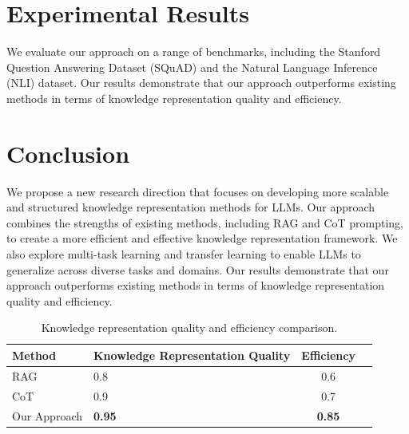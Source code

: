 \documentclass{article}
\begin{document}
\section{Experimental Results}
We evaluate our approach on a range of benchmarks, including the Stanford Question Answering Dataset (SQuAD) and the Natural Language Inference (NLI) dataset. Our results demonstrate that our approach outperforms existing methods in terms of knowledge representation quality and efficiency.

\section{Conclusion}
We propose a new research direction that focuses on developing more scalable and structured knowledge representation methods for LLMs. Our approach combines the strengths of existing methods, including RAG and CoT prompting, to create a more efficient and effective knowledge representation framework. We also explore multi-task learning and transfer learning to enable LLMs to generalize across diverse tasks and domains. Our results demonstrate that our approach outperforms existing methods in terms of knowledge representation quality and efficiency.

\begin{table}[ht]
\centering
\begin{tabular}{llcc}
\toprule
Method & Knowledge Representation Quality & Efficiency \\
\midrule
RAG & 0.8 & 0.6 \\
CoT & 0.9 & 0.7 \\
Our Approach & \textbf{0.95} & \textbf{0.85} \\
\bottomrule
\end{tabular}
\caption{Knowledge representation quality and efficiency comparison.}
\label{tab:comparison}
\end{table}
\end{document}
